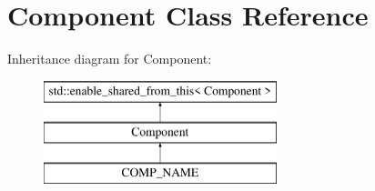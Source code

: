 \hypertarget{classComponent}{}\section{Component Class Reference}
\label{classComponent}
Inheritance diagram for Component\+:\begin{figure}[H]
\begin{center}
\leavevmode
\includegraphics[height=3.000000cm]{classComponent}
\end{center}
\end{figure}
